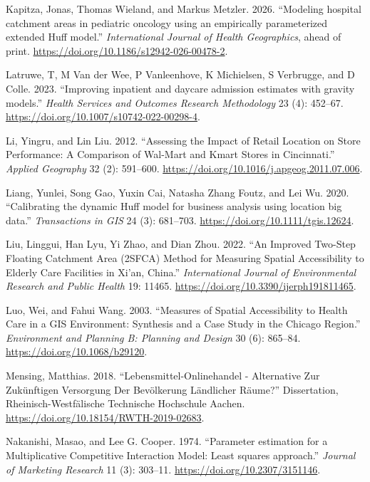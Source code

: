\documentclass[
]{article}
\newlength{\cslhangindent}
\newenvironment{CSLReferences}[2] %
 {\begin{list}{}{%
  \setlength{\itemindent}{0pt}
  \setlength{\leftmargin}{0pt}
  \setlength{\parsep}{0pt}
  \ifodd #1
   \setlength{\leftmargin}{\cslhangindent}
   \setlength{\itemindent}{-1\cslhangindent}
  \fi
  \setlength{\itemsep}{#2\baselineskip}}}
 {\end{list}}
\begin{document}
\begin{CSLReferences}{1}{1}
Kapitza, Jonas, Thomas Wieland, and Markus Metzler. 2026. {``{Modeling
hospital catchment areas in pediatric oncology using an empirically
parameterized extended Huff model}.''} \emph{International Journal of
Health Geographics}, ahead of print.
\url{https://doi.org/10.1186/s12942-026-00478-2}.

Latruwe, T, M Van der Wee, P Vanleenhove, K Michielsen, S Verbrugge, and
D Colle. 2023. {``{Improving inpatient and daycare admission estimates
with gravity models}.''} \emph{Health Services and Outcomes Research
Methodology} 23 (4): 452--67.
\url{https://doi.org/10.1007/s10742-022-00298-4}.

Li, Yingru, and Lin Liu. 2012. {``Assessing the Impact of Retail
Location on Store Performance: A Comparison of Wal-Mart and Kmart Stores
in Cincinnati.''} \emph{Applied Geography} 32 (2): 591--600.
\url{https://doi.org/10.1016/j.apgeog.2011.07.006}.

Liang, Yunlei, Song Gao, Yuxin Cai, Natasha Zhang Foutz, and Lei Wu.
2020. {``{Calibrating the dynamic Huff model for business analysis using
location big data}.''} \emph{Transactions in GIS} 24 (3): 681--703.
\url{https://doi.org/10.1111/tgis.12624}.

Liu, Linggui, Han Lyu, Yi Zhao, and Dian Zhou. 2022. {``{An Improved
Two-Step Floating Catchment Area (2SFCA) Method for Measuring Spatial
Accessibility to Elderly Care Facilities in Xi'an, China}.''}
\emph{International Journal of Environmental Research and Public Health}
19: 11465. \url{https://doi.org/10.3390/ijerph191811465}.

Luo, Wei, and Fahui Wang. 2003. {``{Measures of Spatial Accessibility to
Health Care in a GIS Environment: Synthesis and a Case Study in the
Chicago Region}.''} \emph{Environment and Planning B: Planning and
Design} 30 (6): 865--84. \url{https://doi.org/10.1068/b29120}.

Mensing, Matthias. 2018. {``{L}ebensmittel-{O}nlinehandel -
{A}lternative Zur Zukünftigen {V}ersorgung Der {B}evölkerung Ländlicher
{R}äume?''} Dissertation, Rheinisch-Westfälische Technische Hochschule
Aachen. \url{https://doi.org/10.18154/RWTH-2019-02683}.

Nakanishi, Masao, and Lee G. Cooper. 1974. {``{Parameter estimation for
a Multiplicative Competitive Interaction Model: Least squares
approach}.''} \emph{Journal of Marketing Research} 11 (3): 303--11.
\url{https://doi.org/10.2307/3151146}.


\end{CSLReferences}
\end{document}
